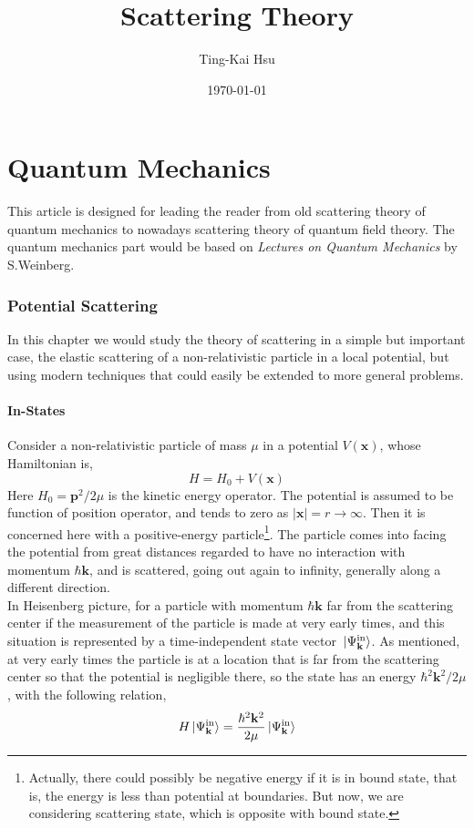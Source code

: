 \documentclass[12pt]{article}
\title{Scattering Theory}
\author{Ting-Kai Hsu}
\date{\today}
\numberwithin{equation}{section}
\begin{document}
\maketitle
\tableofcontents
\part{Quantum Mechanics}
This article is designed for leading the reader from old scattering theory of quantum mechanics to nowadays scattering theory of quantum field theory.
The quantum mechanics part would be based on \textit{Lectures on Quantum Mechanics} by S.Weinberg.
\section{Potential Scattering}
In this chapter we would study the theory of scattering in a simple but important case, the elastic scattering of a non-relativistic particle in a local potential, but using modern techniques that could easily be extended to more general problems.
\subsection{In-States}
Consider a non-relativistic particle of mass $\mu$ in a potential $V(\mathbf{x})$, whose Hamiltonian is,
\begin{equation}
    H = H_0 + V(\mathbf{x})
\end{equation}
Here $H_0 = \mathbf{p}^2/2\mu$ is the kinetic energy operator. 
The potential is assumed to be function of position operator, and tends to zero as $|\mathbf{x}| = r\rightarrow\infty$.
Then it is concerned here with a positive-energy particle\footnote{Actually, there could possibly be negative energy if it is in bound state, that is, the energy is less than potential at boundaries. But now, we are considering scattering state, which is opposite with bound state.}.
The particle comes into facing the potential from great distances regarded to have no interaction with momentum $\hbar\mathbf{k}$, and is scattered, going out again to infinity, generally along a different direction.
\\\indent In Heisenberg picture, for a particle with momentum $\hbar\mathbf{k}$ far from the scattering center if the measurement of the particle is made at very early times, and this situation is represented by a time-independent state vector $\ket*{\Psi^{\text{in}}_{\mathbf{k}}}$.
As mentioned, at very early times the particle is at a location that is far from the scattering center so that the potential is negligible there, so the state has an energy $\hbar^2\mathbf{k}^2/2\mu$, with the following relation,
\begin{equation}
    H\ket*{\Psi_{\mathbf{k}}^{\text{in}}} = \frac{\hbar^2\mathbf{k}^2}{2\mu}\ket*{\Psi_{\mathbf{k}}^{\text{in}}}
\end{equation}
\end{document}
